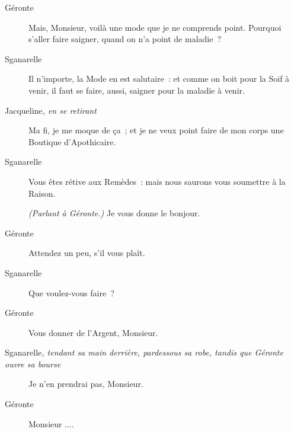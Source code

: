 \documentclass[french,twoside]{book} %
\begin{document}
 \begin{description} \item[Géronte] 

Mais, Monsieur, voilà une mode que je ne comprends point. Pourquoi s’aller faire saigner, quand on n’a point de maladie ?\end{description}
 \begin{description} \item[Sganarelle] 

Il n’importe, la Mode en est salutaire : et comme on boit pour la Soif à venir, il faut se faire, aussi, saigner pour la maladie à venir.\end{description}
 \begin{description} \item[Jacqueline\textit{, en se retirant}\par
] 

Ma fi, je me moque de ça ; et je ne veux point faire de mon corps une Boutique d’Apothicaire.\end{description}
 \begin{description} \item[Sganarelle] 

Vous êtes rétive aux Remèdes : mais nous saurons vous soumettre à la Raison.

\textit{(Parlant à Géronte.) }Je vous donne le bonjour.\end{description}
 \begin{description} \item[Géronte] 

Attendez un peu, s’il vous plaît.\end{description}
 \begin{description} \item[Sganarelle] 

Que voulez-vous faire ?\end{description}
 \begin{description} \item[Géronte] 

Vous donner de l’Argent, Monsieur.\end{description}
 \begin{description} \item[Sganarelle\textit{, tendant sa main derrière, pardessous sa robe, tandis que Géronte ouvre sa bourse}\par
] 

Je n’en prendrai pas, Monsieur.\end{description}
 \begin{description} \item[Géronte] 

Monsieur ....\end{description}
\end{document}
